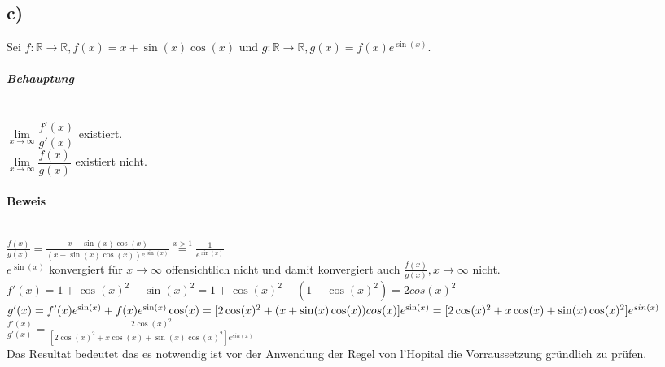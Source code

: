 \subsection*{c)}
Sei $ f:\mathbb{R} \to \mathbb{R},f(x) = x + \sin(x)\cos(x) $
und $ g:\mathbb{R} \to \mathbb{R},g(x) = f(x)e^{\sin(x)} $.

\subparagraph*{Behauptung} ~\\
\indent $\lim\limits_{x \to \infty} \dfrac{f'(x)}{g'(x)}$ existiert.\\
\indent $\lim\limits_{x \to \infty} \dfrac{f(x)}{g(x)}$ existiert nicht.

\paragraph*{Beweis} ~\\

$ \frac{f(x)}{g(x)} 
= \frac{x+\sin(x)\cos(x)}{(x+\sin(x)\cos(x))e^{\sin(x)}}
\overset{x > 1}{=} \frac{1}{e^{\sin(x)}}$ \\

$ e^{\sin(x)} $ konvergiert für $x \to \infty$ offensichtlich nicht und damit konvergiert auch $ \frac{f(x)}{g(x)} , x \to \infty$ nicht. \\

$ f'(x) = 1 + \cos(x)^{2}-\sin(x)^{2} = 1 + \cos(x)^{2}-(1-\cos(x)^{2}) = 2 cos(x)^{2}$ \\

$ g'(x) = f'(x)e^{\sin(x)}+f(x)e^{\sin(x)}\cos(x) \\
= [2\cos(x)^{2} + (x + \sin(x)\cos(x))cos(x)]e^{\sin(x)} \\
= [2\cos(x)^{2} + x\cos(x) + \sin(x)\cos(x)^{2}]e^{sin(x)} $ \\

$\frac{f'(x)}{g'(x)} = \frac{2\cos(x)^{2}}{[2\cos(x)^{2} + x\cos(x) + \sin(x)\cos(x)^{2}]e^{sin(x)}}$ \\



Das Resultat bedeutet das es notwendig ist vor der Anwendung der Regel von l'Hopital die Vorraussetzung gründlich zu prüfen.